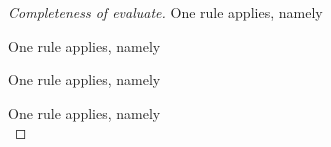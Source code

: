 \begin{proof}[Completeness of evaluate]
    {
    One rule applies, namely \\
    }

    {One rule applies, namely \\

    }

    {
    One rule applies, namely \\
    }

    {One rule applies, namely \\

}
\end{proof}
